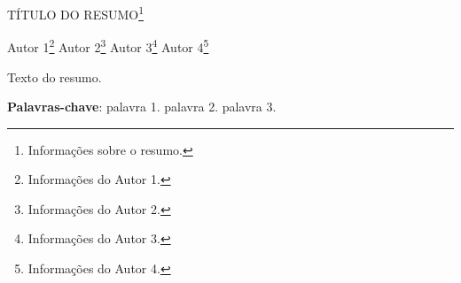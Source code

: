 \documentclass[article,12pt,onesidea,4paper,english,brazil]{abntex2}
\begin{document}
	
	
	\frenchspacing 
	
	\begin{center}
		\LARGE TÍTULO DO RESUMO\footnote{Informações sobre o resumo.}
		
		\normalsize
		Autor 1\footnote{Informações do Autor 1.} 
		Autor 2\footnote{Informações do Autor 2.} 
		Autor 3\footnote{Informações do Autor 3.} 
		Autor 4\footnote{Informações do Autor 4.} 
	\end{center}
	
	\noindent Texto do resumo.
	
	\vspace{\onelineskip}
	
	\noindent
	\textbf{Palavras-chave}: palavra 1. palavra 2. palavra 3.
	
\end{document}
